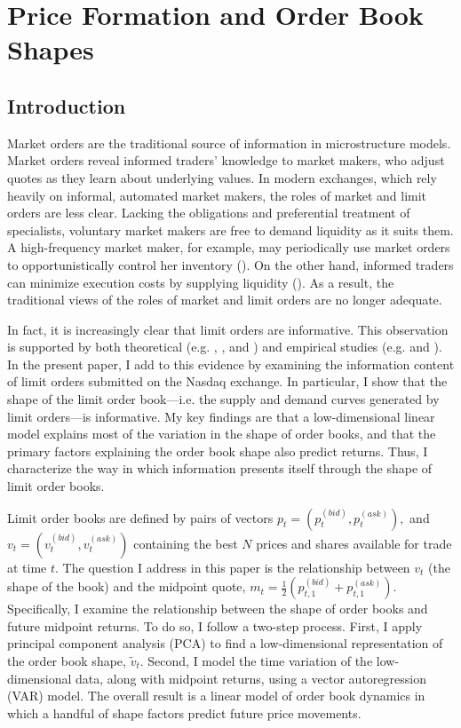 \chapter{Price Formation and Order Book Shapes}
\label{chapter:three}

\section{Introduction}
\label{intro}

Market orders are the traditional source of information in microstructure models. Market orders reveal informed traders' knowledge to market makers, who adjust quotes as they learn about underlying values. In modern exchanges, which rely heavily on informal, automated market makers, the roles of market and limit orders are less clear. Lacking the obligations and preferential treatment of specialists, voluntary market makers are free to demand liquidity as it suits them. A high-frequency market maker, for example, may periodically use market orders to opportunistically control her inventory (\citet{Xu2015}). On the other hand, informed traders can minimize execution costs by supplying liquidity (\citet{Cont2017}). As a result, the traditional views of the roles of market and limit orders are no longer adequate.

In fact, it is increasingly clear that limit orders are informative. This observation is supported by both theoretical (e.g. \citet{Kaniel2006}, \citet{Goettler2009}, and \cite{Rosu2009}) and empirical studies (e.g. \citet{Cao2009} and \citet{Brogaard2015}). In the present paper, I add to this evidence by examining the information content of limit orders submitted on the Nasdaq exchange. In particular, I show that the shape of the limit order book---i.e. the supply and demand curves generated by limit orders---is informative. My key findings are that a low-dimensional linear model explains most of the variation in the shape of order books, and that the primary factors explaining the order book shape also predict returns. Thus, I characterize the way in which information presents itself through the shape of limit order books.

Limit order books are defined by pairs of vectors $p_t = (p_t^{(bid)}, p_t^{(ask)}),$ and $v_t = (v_t^{(bid)}, v_t^{(ask)})$ containing the best $N$ prices and shares available for trade at time $t$. The question I address in this paper is the relationship between $v_t$ (the shape of the book) and the midpoint quote, $m_t = \frac{1}{2} \left( p_{t,1}^{(bid)} + p_{t,1}^{(ask)} \right)$. Specifically, I examine the relationship between the shape of order books and future midpoint returns. To do so, I follow a two-step process. First, I apply principal component analysis (PCA) to find a low-dimensional representation of the order book shape, $\tilde{v}_t$. Second, I model the time variation of the low-dimensional data, along with midpoint returns, using a vector autoregression (VAR) model. The overall result is a linear model of order book dynamics in which a handful of shape factors predict future price movements.

